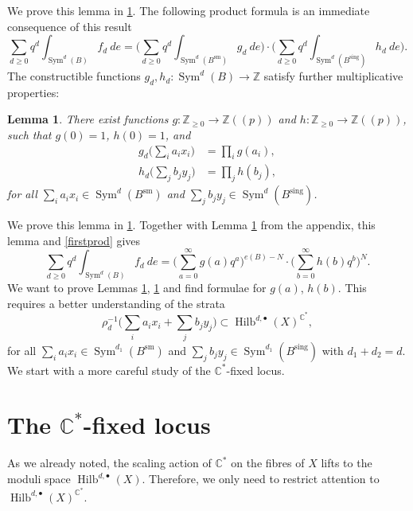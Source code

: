 \documentclass{amsart}
\newtheorem{lemma}[theorem]{Lemma}
\theoremstyle{definition}
\newcommand{\CC} {\mathbb{C}}          %
\newcommand{\ZZ} {\mathbb{Z}}		%
\newcommand{\Sym}{\operatorname{Sym}}
\newcommand{\Hilb}{\operatorname{Hilb}}
\newcommand{\sm}{\operatorname{sm}}
\newcommand{\sing}{\operatorname{sing}}
\begin{document}
We prove this lemma in \ref{}. The following product formula is an immediate consequence of this result
\begin{equation} \label{firstprod}
\sum_{d \geq 0} q^d \int_{\Sym^d(B)} f_d \ de = \Big( \sum_{d \geq 0} q^d \int_{\Sym^d(B^{\sm})} g_d \ de \Big) \cdot \Big( \sum_{d \geq 0} q^d \int_{\Sym^d(B^{\sing})} h_d \ de \Big). 
\end{equation}
The constructible functions $g_d, h_d  : \Sym^d(B) \rightarrow \ZZ$ satisfy further multiplicative properties:
\begin{lemma} \label{mult2}
There exist functions $g : \ZZ_{\geq 0} \rightarrow \ZZ(\!(p)\!)$ and $h : \ZZ_{\geq 0} \rightarrow \ZZ(\!(p)\!)$, such that $g(0)=1$, $h(0)=1$, and
\begin{align*}
g_{d}\Big(\sum_i a_i x_i\Big) &= \prod_{i} g(a_i), \\
h_{d}\Big(\sum_j b_j y_j\Big) &= \prod_{j} h(b_j), 
\end{align*}
for all $\sum_i a_i x_i \in \Sym^{d}(B^{\sm})$ and $\sum_j b_j y_j \in \Sym^{d}(B^{\sing})$.
\end{lemma}
We prove this lemma in \ref{}. Together with Lemma \ref{} from the appendix, this lemma and \eqref{firstprod} gives
$$
\sum_{d \geq 0} q^d \int_{\Sym^d(B)} f_d \ de = \Big( \sum_{a=0}^{\infty} g(a) q^a \Big)^{e(B) - N} \cdot \Big( \sum_{b=0}^{\infty} h(b) q^b \Big)^N.
$$
We want to prove Lemmas \ref{}, \ref{} and find formulae for $g(a)$, $h(b)$. This requires a better understanding of the strata
$$
\rho_{d}^{-1} \Big(\sum_i a_i x_i + \sum_j b_j y_j \Big) \subset \Hilb^{d, \bullet}(X)^{\CC^*},
$$
for all $\sum_i a_i x_i \in \Sym^{d_1}(B^{\sm})$ and $\sum_j b_j y_j \in \Sym^{d_1}(B^{\sing})$ with $d_1+d_2=d$. We start with a more careful study of the $\CC^*$-fixed locus.


\section{The $\CC^*$-fixed locus} As we already noted, the scaling action of $\CC^*$ on the fibres of $X$ lifts to the moduli space $\Hilb^{d,\bullet}(X)$. 
Therefore, we only need to restrict attention to $\Hilb^{d,\bullet}(X)^{\CC^*}$. 
\end{document}
